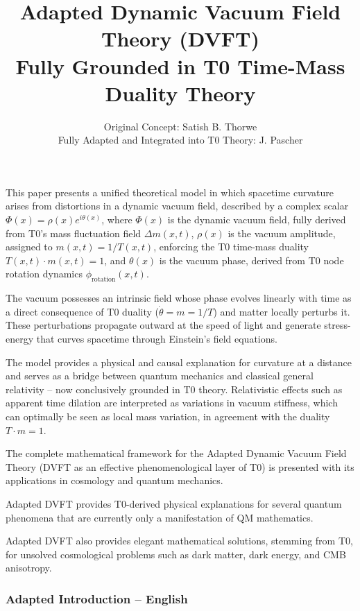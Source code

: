 \documentclass[12pt,a4paper]{article}
\title{Adapted Dynamic Vacuum Field Theory (DVFT)\\ 
	Fully Grounded in T0 Time-Mass Duality Theory}
\author{Original Concept: Satish B. Thorwe\\
	Fully Adapted and Integrated into T0 Theory: J. Pascher}
\begin{document}
	
	\maketitle
	
	\tableofcontents
	\begin{t0box}[Summary]
		This paper presents a unified theoretical model in which spacetime curvature arises from distortions in a dynamic vacuum field, described by a complex scalar $\Phi(x)=\rho(x)e^{i\theta(x)}$, where $\Phi(x)$ is the dynamic vacuum field, fully derived from T0's mass fluctuation field $\Delta m(x,t)$, $\rho(x)$ is the vacuum amplitude, assigned to $m(x,t) = 1/T(x,t)$, enforcing the T0 time-mass duality $T(x,t) \cdot m(x,t) = 1$, and $\theta(x)$ is the vacuum phase, derived from T0 node rotation dynamics $\phi_{\text{rotation}}(x,t)$.
		
		The vacuum possesses an intrinsic field whose phase evolves linearly with time as a direct consequence of T0 duality ($\dot{\theta} = m = 1/T$) and matter locally perturbs it. These perturbations propagate outward at the speed of light and generate stress-energy that curves spacetime through Einstein's field equations.
		
		The model provides a physical and causal explanation for curvature at a distance and serves as a bridge between quantum mechanics and classical general relativity – now conclusively grounded in T0 theory. Relativistic effects such as apparent time dilation are interpreted as variations in vacuum stiffness, which can optimally be seen as local mass variation, in agreement with the duality $T \cdot m = 1$.
		
		The complete mathematical framework for the Adapted Dynamic Vacuum Field Theory (DVFT as an effective phenomenological layer of T0) is presented with its applications in cosmology and quantum mechanics.
		
		Adapted DVFT provides T0-derived physical explanations for several quantum phenomena that are currently only a manifestation of QM mathematics.
		
		Adapted DVFT also provides elegant mathematical solutions, stemming from T0, for unsolved cosmological problems such as dark matter, dark energy, and CMB anisotropy.
	\end{t0box}
	
	\subsubsection{Adapted Introduction – English}
	
\end{document}
